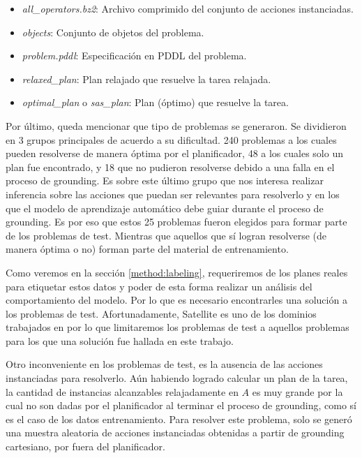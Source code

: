\begin{itemize}
    \item \emph{all\_operators.bz2}: Archivo comprimido del conjunto de acciones
    instanciadas.
    \item \emph{objects}: Conjunto de objetos del problema.
    \item \emph{problem.pddl}: Especificación en PDDL del problema.
    \item \emph{relaxed\_plan}: Plan relajado que resuelve la tarea relajada.
    \item \emph{optimal\_plan} o \emph{sas\_plan}: Plan (óptimo) que resuelve la
    tarea.
\end{itemize}

Por último, queda mencionar que tipo de problemas se generaron. Se dividieron en
3 grupos principales de acuerdo a su dificultad. 240 problemas a los cuales
pueden resolverse de manera óptima por el planificador, 48 a los cuales solo un
plan fue encontrado, y 18 que no pudieron resolverse debido a una falla en el
proceso de grounding. Es sobre este último grupo que nos interesa realizar
inferencia sobre las acciones que puedan ser relevantes para resolverlo y en los
que el modelo de aprendizaje automático debe guiar durante el proceso de
grounding. Es por eso que estos 25 problemas fueron elegidos para formar parte
de los problemas de test. Mientras que aquellos que sí logran resolverse (de
manera óptima o no) forman parte del material de entrenamiento.

Como veremos en la sección \ref{method:labeling}, requeriremos de los planes
reales para etiquetar estos datos y poder de esta forma realizar un análisis del
comportamiento del modelo. Por lo que es necesario encontrarles una solución a
los problemas de test. Afortunadamente, Satellite es uno de los dominios
trabajados en \citep{Gnad_Torralba_Dominguez_Areces_Bustos_2019} por lo que
limitaremos los problemas de test a aquellos problemas para los que una
solución fue hallada en este trabajo.

Otro inconveniente en los problemas de test, es la ausencia de las acciones
instanciadas para resolverlo. Aún habiendo logrado calcular un plan de la tarea,
la cantidad de instancias alcanzables relajadamente en $A$ es muy grande por la
cual no son dadas por el planificador al terminar el proceso de grounding, como
sí es el caso de los datos entrenamiento. Para resolver este problema, solo se generó
una muestra aleatoria de acciones instanciadas obtenidas a partir de grounding
cartesiano, por fuera del planificador.

